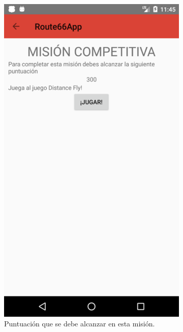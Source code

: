 \documentclass[twoside]{report}
\begin{document}
\begin{figure}[H]
\begin{center}
	\begin{subfigure}[t]{.3\linewidth}
		\includegraphics[scale=0.2]{images/userguide/28.png}
		\caption{Puntuación que se debe alcanzar en esta misión.}
	\end{subfigure}\hspace{2mm}%
	\begin{subfigure}[t]{.3\linewidth}

\end{subfigure}
\end{center}
\end{figure}
\end{document}
